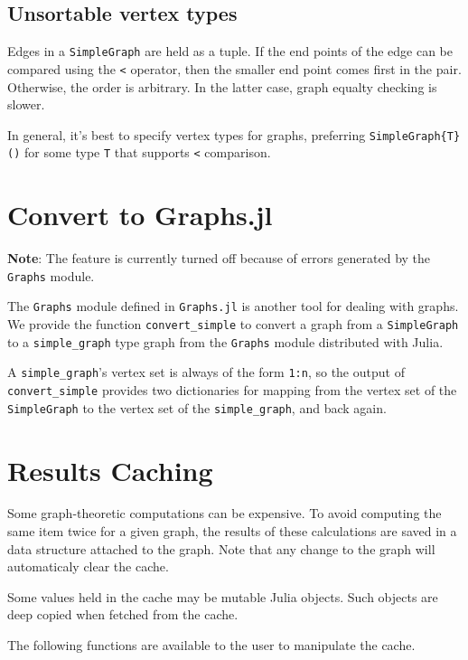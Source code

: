 \documentclass[oneside]{amsart}
\begin{document}
\subsection*{Unsortable vertex types}

Edges in a \verb|SimpleGraph| are held as a tuple. If the end points
of the edge can be compared using the \verb|<| operator, then the
smaller end point comes first in the pair. Otherwise, the order is
arbitrary. In the latter case, graph equalty checking is slower.

In general, it's best to specify vertex types for graphs, preferring
\verb|SimpleGraph{T}()| for some type \verb|T| that supports \verb|<|
comparison.


\section{Convert to Graphs.jl}
\label{sect:convert}


\textbf{Note}: The feature is currently turned off because of
errors generated by the \verb|Graphs| module.


The \verb|Graphs| module defined in \verb|Graphs.jl| is another tool
for dealing with graphs. We provide the function \verb|convert_simple|
to convert a graph from a \verb|SimpleGraph| to a
\verb|simple_graph| type graph from the \verb|Graphs| module
distributed with Julia.

A \verb|simple_graph|'s vertex set is always of the form \verb|1:n|,
so the output of \verb|convert_simple| provides two dictionaries for
mapping from the vertex set of the \verb|SimpleGraph| to the vertex set
of the \verb|simple_graph|, and back again.


\section{Results Caching}
\label{sect:cache}

Some graph-theoretic computations can be expensive. To avoid computing
the same item twice for a given graph, the results of these
calculations are saved in a data structure attached to the graph. Note
that any change to the graph will automaticaly clear the cache.

Some values held in the cache may be mutable Julia objects. Such
objects are deep copied when fetched from the cache.


The following functions are available to the user to manipulate the
cache.
\end{document}
